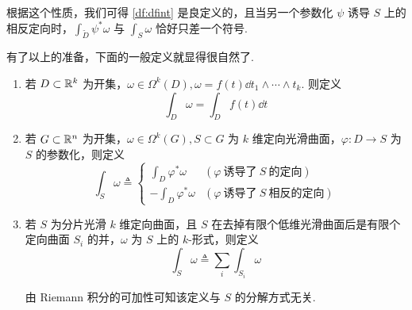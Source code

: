 根据这个性质，我们可得 \ref{df:dfint} 是良定义的，且当另一个参数化 $\psi$ 诱导 $S$ 上的相反定向时，$\displaystyle\int_{\widetilde{D}}\psi^*\omega$ 与 $\displaystyle\int_S\omega$ 恰好只差一个符号.


有了以上的准备，下面的一般定义就显得很自然了.

\begin{definition}
    \begin{enumerate}
        \item 若 $D\subset\mathbb{R}^k$ 为开集，$\omega\in\Omega^k(D),\omega=f(t)\dd t_1\wedge\cdots\wedge t_k$. 则定义
$$
\int_D\omega=\int_Df(t)\dd t
$$

        \item 若 $G\subset\mathbb{R}^n$ 为开集，$\omega\in\Omega^k(G),S\subset G$ 为 $k$ 维定向光滑曲面，$\varphi:D\to S$ 为 $S$ 的参数化，则定义
$$
\int_S\omega\triangleq\begin{cases}
    \displaystyle\int_D\varphi^*\omega & (\varphi~\text{诱导了}~S~\text{的定向})\\
    \displaystyle-\int_D\varphi^*\omega & (\varphi~\text{诱导了}~S~\text{相反的定向})
\end{cases}
$$

        \item 若 $S$ 为分片光滑 $k$ 维定向曲面，且 $S$ 在去掉有限个低维光滑曲面后是有限个定向曲面 $S_i$ 的并，$\omega$ 为 $S$ 上的 $k$-形式，则定义
$$
\int_S\omega\triangleq\sum_i\int_{S_i}\omega
$$

        由 Riemann 积分的可加性可知该定义与 $S$ 的分解方式无关.
    \end{enumerate}
\end{definition}
